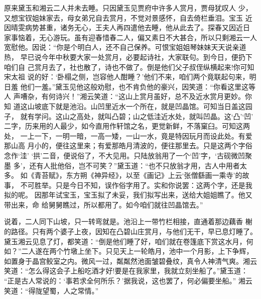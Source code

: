 原来黛玉和湘云二人并未去睡。只因黛玉见贾府中许多人赏月，贾母犹叹人
少，又想宝钗姐妹家去，母女弟兄自去赏月，不觉对景感怀，自去倚栏垂泪。宝玉
近因晴雯病势甚重，诸务无心，王夫人再四遣他去睡，他从此去了。探春又因近日
家事恼着，无心游玩。虽有迎春惜春二人，偏又素日不大甚合，所以只剩湘云一人
宽慰他。因说：“你是个明白人，还不自己保养。可恨宝姐姐琴妹妹天天说亲道热，
早已说今年中秋要大家一处赏月，必要起诗社，大家联句。到今日，便扔下咱们自
己赏月去了，社也散了，诗也不做了。倒是他们父子叔侄纵横起来!你可知宋太祖
说的好：‘卧榻之侧，岂容他人酣睡？’他们不来，咱们两个竟联起句来，明日羞
他们一羞。”黛玉见他这般劝慰，也不肯负他的豪兴，因笑道：“你看这里这等人
声嘈杂，有何诗兴！”湘云笑道：“这山上赏月虽好，总不及近水赏月更妙。你知
道这山坡底下就是池沿。山凹里近水一个所在，就是凹晶馆。可知当日盖这园子，
就有学问。这山之高处，就叫凸碧；山之低洼近水处，就叫凹晶。这‘凸’‘凹’
二字，历来用的人最少，如今直用作轩馆之名，更觉新鲜，不落窠臼。可知这两处，
一上一下，一明一暗，一高一矮，一山一水，竟是特因玩月而设此处。有爱那山高
月小的，便往这里来；有爱那皓月清波的，便往那里去。只是这两个字俗念作‘洼’
‘拱’二音，便说俗了，不大见用。只陆放翁用了一个‘凹’字，‘古砚微凹聚墨
多’，还有人批他俗，岂不可笑？”黛玉道：“也不只放翁才用，古人中用者太多。
如《青苔赋》，东方朔《神异经》，以至《画记》上云‘张僧繇画一乘寺’的故事，
不可胜举。只是今日不知，误作俗字用了。实和你说罢：这两个字，还是我拟的呢。
因那年试宝玉，宝玉拟了未妥，我们拟写出来，送给大姐姐瞧了。他又带出来，命
给舅舅瞧过，所以都用了。如今咱们就往凹晶馆去。”

说着，二人同下山坡，只一转弯就是。池沿上一带竹栏相接，直通着那边藕香
榭的路径。只有两个婆子上夜，因知在凸碧山庄赏月，与他们无干，早已息灯睡了。
黛玉湘云见息了灯，都笑道：“倒是他们睡了好，咱们就在卷篷底下赏这水月，何
如？”二人遂在两个竹墩上坐下。只见天上一轮皓月，池中一个月影，上下争辉，
如置身于晶宫鲛室之内。微风一过，粼粼然池面皱碧叠纹，真令人神清气爽。湘云
笑道：“怎么得这会子上船吃酒才好!要是在我家里，我就立刻坐船了。”黛玉道：
“正是古人常说的：‘事若求全何所乐？’据我说，这也罢了，何必偏要坐船。”
湘云笑道：“得陇望蜀，人之常情。”

